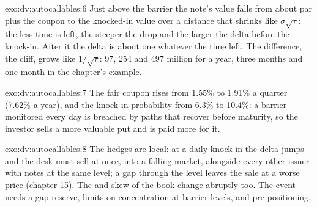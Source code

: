 \begin{solution}{exo:dv:autocallables:6}
Just above the barrier the note's value falls from about par plus the coupon to the knocked-in value over a distance that shrinks like
$\sigma\sqrt\tau$: the less time is left, the steeper the drop and the larger the delta before the knock-in. After it the delta is about
one whatever the time left. The difference, the cliff, grows like $1/\sqrt\tau$: 97, 254 and 497 million for a year, three months and one
month in the chapter's example.
\end{solution}

\begin{solution}{exo:dv:autocallables:7}
The fair coupon rises from 1.55\% to 1.91\% a quarter (7.62\% a year), and the knock-in probability from 6.3\% to 10.4\%: a barrier monitored
every day is breached by paths that recover before maturity, so the investor sells a more valuable put and is paid more for it.
\end{solution}

\begin{solution}{exo:dv:autocallables:8}
The hedges are local: at a daily knock-in the delta jumps and the desk must sell at once, into a falling market, alongside every other
issuer with notes at the same level; a gap through the level leaves the sale at a worse price (chapter 15). The  and skew of the book
change abruptly too. The event needs a gap reserve, limits on concentration at barrier levels, and pre-positioning.
\end{solution}

